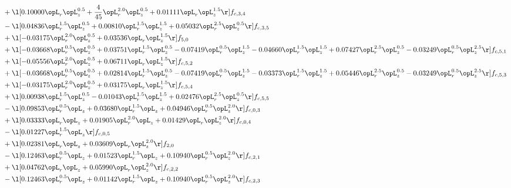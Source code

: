 \begin{alignat}{2}
& + \l[  0.10000 \opL_r \opL_z^{0.5} + \frac{4}{45} \opL_r^{2.0} \opL_z^{0.5} +  0.01111 \opL_r \opL_z^{1.5}  \r] f_{c,3,4} \nonumber \\ 
& - \l[  0.04836 \opL_r^{1.5} \opL_z^{0.5} +  0.00810 \opL_r^{1.5} \opL_z^{1.5} +  0.05032 \opL_r^{2.5} \opL_z^{0.5}  \r] f_{c,3,5} \nonumber \\ 
& + \l[  -0.03175 \opL_r^{2.0} \opL_z^{0.5} +  0.03536 \opL_r \opL_z^{1.5}  \r] f_{5,0} \nonumber \\ 
& + \l[  -0.03668 \opL_r^{0.5} \opL_z^{0.5} +  0.03751 \opL_r^{1.5} \opL_z^{0.5}   -0.07419 \opL_r^{0.5} \opL_z^{1.5}   -0.04660 \opL_r^{1.5} \opL_z^{1.5} +  0.07427 \opL_r^{2.5} \opL_z^{0.5}   -0.03249 \opL_r^{0.5} \opL_z^{2.5}  \r] f_{c,5,1} \nonumber \\ 
& + \l[  -0.05556 \opL_r^{2.0} \opL_z^{0.5} +  0.06711 \opL_r \opL_z^{1.5}  \r] f_{c,5,2} \nonumber \\ 
& + \l[  -0.03668 \opL_r^{0.5} \opL_z^{0.5} +  0.02814 \opL_r^{1.5} \opL_z^{0.5}   -0.07419 \opL_r^{0.5} \opL_z^{1.5}   -0.03373 \opL_r^{1.5} \opL_z^{1.5} +  0.05446 \opL_r^{2.5} \opL_z^{0.5}   -0.03249 \opL_r^{0.5} \opL_z^{2.5}  \r] f_{c,5,3} \nonumber \\ 
& + \l[  -0.03175 \opL_r^{2.0} \opL_z^{0.5} +  0.03175 \opL_r \opL_z^{1.5}  \r] f_{c,5,4} \nonumber \\ 
& + \l[  0.00938 \opL_r^{1.5} \opL_z^{0.5}   -0.01043 \opL_r^{1.5} \opL_z^{1.5} +  0.02476 \opL_r^{2.5} \opL_z^{0.5}  \r] f_{c,5,5} \nonumber \\ 
& - \l[  0.09853 \opL_r^{0.5} \opL_z +  0.03680 \opL_r^{1.5} \opL_z +  0.04946 \opL_r^{0.5} \opL_z^{2.0}  \r] f_{c,0,3} \nonumber \\ 
& + \l[  0.03333 \opL_r \opL_z +  0.01905 \opL_r^{2.0} \opL_z +  0.01429 \opL_r \opL_z^{2.0}  \r] f_{c,0,4} \nonumber \\ 
& - \l[  0.01227 \opL_r^{1.5} \opL_z  \r] f_{c,0,5} \nonumber \\ 
& + \l[  0.02381 \opL_r \opL_z +  0.03609 \opL_r \opL_z^{2.0}  \r] f_{2,0} \nonumber \\ 
& - \l[  0.12463 \opL_r^{0.5} \opL_z +  0.01523 \opL_r^{1.5} \opL_z +  0.10940 \opL_r^{0.5} \opL_z^{2.0}  \r] f_{c,2,1} \nonumber \\ 
& + \l[  0.04762 \opL_r \opL_z +  0.05990 \opL_r \opL_z^{2.0}  \r] f_{c,2,2} \nonumber \\ 
& - \l[  0.12463 \opL_r^{0.5} \opL_z +  0.01142 \opL_r^{1.5} \opL_z +  0.10940 \opL_r^{0.5} \opL_z^{2.0}  \r] f_{c,2,3} \nonumber \\ 

\end{alignat}
